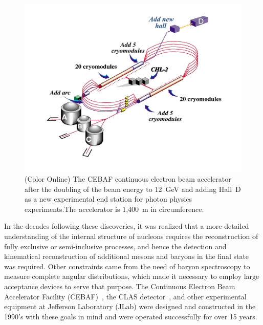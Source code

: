 \documentclass[final,3p,twocolumn]{elsarticle}
\begin{document}
\begin{figure}[ht]
\centerline{\includegraphics[width=1.0\columnwidth]{cebaf.pdf}}
\caption{(Color Online) The CEBAF continuous electron beam accelerator after the doubling of the beam energy to 12~GeV and 
adding Hall~D as a new experimental end station for photon physics experiments.The accelerator is 1,400~m in
circumference.}
\label{cebaf12}
\end{figure} 

In the decades following these discoveries, it was realized that a more detailed understanding of the internal
structure of nucleons requires the reconstruction of fully exclusive or semi-inclusive processes, and hence the
detection and kinematical reconstruction of additional mesons and baryons in the final state was required.  Other
constraints came from the need of baryon spectroscopy to measure complete angular distributions, which made it
necessary to employ large acceptance devices to serve that purpose. The Continuous Electron Beam Accelerator
Facility (CEBAF)~\cite{Leemann:2001dg}, the CLAS detector~\cite{Mecking:2003zu}, and other experimental
equipment at Jefferson Laboratory (JLab) were designed and constructed in the 1990's with these goals in mind
and were operated successfully for over 15 years. 
\end{document}
